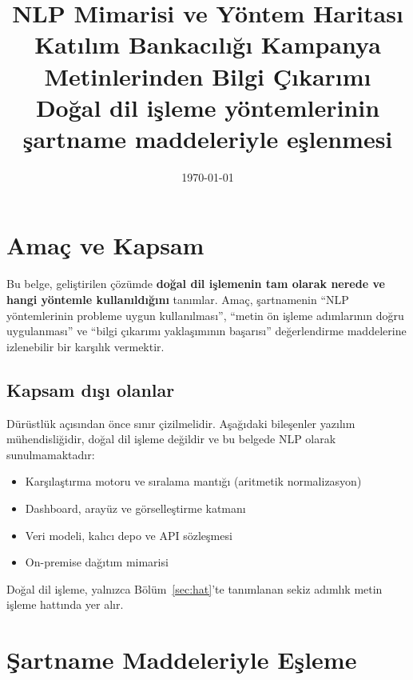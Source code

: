 \documentclass[11pt,a4paper]{article}
\title{\vspace{-1.5cm}\textbf{NLP Mimarisi ve Yöntem Haritası}\\[0.3cm]
\large Katılım Bankacılığı Kampanya Metinlerinden Bilgi Çıkarımı\\
\normalsize Doğal dil işleme yöntemlerinin şartname maddeleriyle eşlenmesi}
\author{}
\date{\today}
\begin{document}
\maketitle
\thispagestyle{fancy}
\vspace{-1cm}

\section{Amaç ve Kapsam}

Bu belge, geliştirilen çözümde \textbf{doğal dil işlemenin tam olarak nerede ve
hangi yöntemle kullanıldığını} tanımlar. Amaç, şartnamenin ``NLP yöntemlerinin
probleme uygun kullanılması'', ``metin ön işleme adımlarının doğru uygulanması''
ve ``bilgi çıkarımı yaklaşımının başarısı'' değerlendirme maddelerine
izlenebilir bir karşılık vermektir.

\subsection{Kapsam dışı olanlar}

Dürüstlük açısından önce sınır çizilmelidir. Aşağıdaki bileşenler yazılım
mühendisliğidir, doğal dil işleme değildir ve bu belgede NLP olarak
sunulmamaktadır:

\begin{itemize}[leftmargin=1.2cm,itemsep=2pt]
  \item Karşılaştırma motoru ve sıralama mantığı (aritmetik normalizasyon)
  \item Dashboard, arayüz ve görselleştirme katmanı
  \item Veri modeli, kalıcı depo ve API sözleşmesi
  \item On-premise dağıtım mimarisi
\end{itemize}

Doğal dil işleme, yalnızca Bölüm~\ref{sec:hat}'te tanımlanan sekiz adımlık
metin işleme hattında yer alır.

\section{Şartname Maddeleriyle Eşleme}
\end{document}
